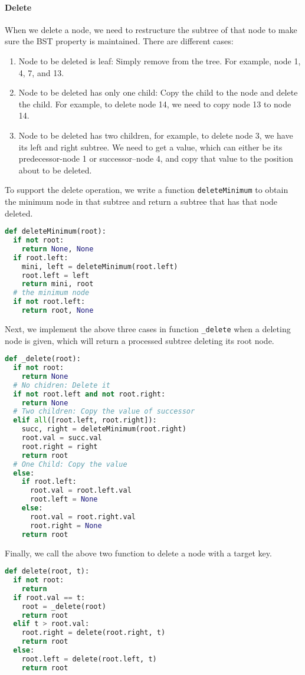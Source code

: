 \documentclass[main.tex]{subfiles}
\begin{document}
\paragraph{Delete} 
When we delete a node, we need to restructure the subtree of that node to make sure the BST property is maintained. There are different cases:
\begin{enumerate}
    \item Node to be deleted is leaf: Simply remove from the tree. For example, node 1, 4, 7, and 13.
    \item Node to be deleted has only one child: Copy the child to the node and delete the child. For example, to delete node 14, we need to copy node 13 to node 14. 
    \item Node to be deleted has two children, for example, to delete node 3, we have its left and right subtree. We need to get a value, which can either be its predecessor-node 1 or successor--node 4, and copy that value to the position about to be deleted. 
\end{enumerate}
To support the delete operation, we write a function \texttt{deleteMinimum} to obtain the minimum node in that subtree and return a subtree that has that node deleted.
\begin{lstlisting}[language=Python]
def deleteMinimum(root):
  if not root:
    return None, None
  if root.left:
    mini, left = deleteMinimum(root.left)
    root.left = left
    return mini, root
  # the minimum node
  if not root.left: 
    return root, None 
\end{lstlisting}
Next, we implement the above three cases in function \texttt{\_delete}  when a deleting node is given,  which will return a processed subtree deleting its root node. 
\begin{lstlisting}[language=Python]
def _delete(root):
  if not root:
    return None
  # No chidren: Delete it
  if not root.left and not root.right:
    return None 
  # Two children: Copy the value of successor
  elif all([root.left, root.right]):
    succ, right = deleteMinimum(root.right)
    root.val = succ.val
    root.right = right
    return root
  # One Child: Copy the value
  else:
    if root.left:
      root.val = root.left.val
      root.left = None
    else:
      root.val = root.right.val
      root.right = None
    return root
\end{lstlisting}
Finally, we call the above two function to delete a node with a target key.
\begin{lstlisting}[language=Python]
def delete(root, t):
  if not root:
    return
  if root.val == t:
    root = _delete(root)
    return root 
  elif t > root.val:
    root.right = delete(root.right, t)
    return root
  else:
    root.left = delete(root.left, t)
    return root
\end{lstlisting}
\end{document}
